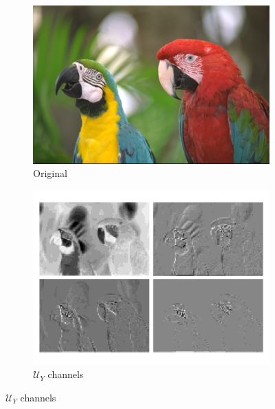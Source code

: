\begin{figure}[t]
    \centering
    \begin{minipage}{0.22\textwidth}
    	\centering
    	\begin{subfigure}{\textwidth}
    		\centering
    		\includegraphics[width=.80\textwidth]{figures/kodim23.pdf}
    		\caption{Original}
    	\end{subfigure}
    \end{minipage}%
    \begin{minipage}{0.40\textwidth}
    	\centering
        \begin{subfigure}{\textwidth}
            \centering
            \includegraphics[width=.95\textwidth]{figures/kodim23_Y_components.pdf}
            \vspace{-10pt}
            \caption{$\bm{\mathcal{U}}_Y$ channels}
        \end{subfigure}
    \end{minipage}%
    \begin{minipage}{0.32\textwidth}

\end{minipage}
\end{figure}
